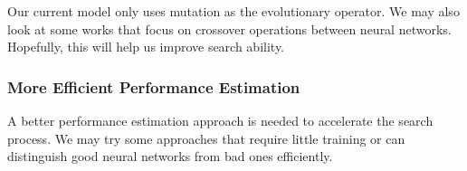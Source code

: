 \documentclass[conference]{IEEEtran}
\begin{document}
Our current model only uses mutation as the evolutionary operator. We may also look at some works that focus on crossover operations between neural networks. Hopefully, this will help us improve search ability.

\subsubsection{More Efficient Performance Estimation}
A better performance estimation approach is needed to accelerate the search process. We may try some approaches that require little training or can distinguish good neural networks from bad ones efficiently.
 



\end{document}
